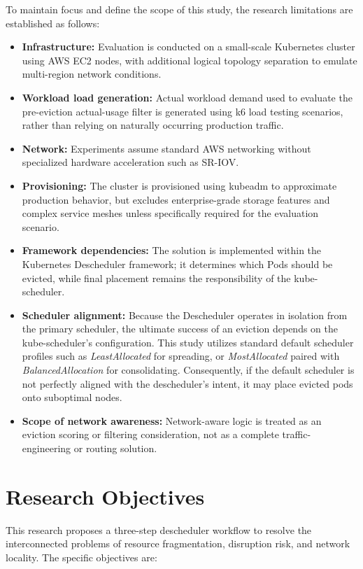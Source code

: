To maintain focus and define the scope of this study, the research limitations are established as follows:

\begin{itemize}
    \item \textbf{Infrastructure:} Evaluation is conducted on a small-scale Kubernetes cluster using AWS EC2 nodes, with additional logical topology separation to emulate multi-region network conditions.
    \item \textbf{Workload load generation:} Actual workload demand used to evaluate the pre-eviction actual-usage filter is generated using k6 load testing scenarios, rather than relying on naturally occurring production traffic.
    \item \textbf{Network:} Experiments assume standard AWS networking without specialized hardware acceleration such as SR-IOV.
    \item \textbf{Provisioning:} The cluster is provisioned using kubeadm to approximate production behavior, but excludes enterprise-grade storage features and complex service meshes unless specifically required for the evaluation scenario.
    \item \textbf{Framework dependencies:} The solution is implemented within the Kubernetes Descheduler framework; it determines which Pods should be evicted, while final placement remains the responsibility of the kube-scheduler.
    \item \textbf{Scheduler alignment:} Because the Descheduler operates in isolation from the primary scheduler, the ultimate success of an eviction depends on the kube-scheduler's configuration. This study utilizes standard default scheduler profiles such as \textit{LeastAllocated} for spreading, or \textit{MostAllocated} paired with \textit{BalancedAllocation} for consolidating. Consequently, if the default scheduler is not perfectly aligned with the descheduler's intent, it may place evicted pods onto suboptimal nodes.
    \item \textbf{Scope of network awareness:} Network-aware logic is treated as an eviction scoring or filtering consideration, not as a complete traffic-engineering or routing solution.
\end{itemize}

\section{Research Objectives}
\label{sec:researchObjectives}

This research proposes a three-step descheduler workflow to resolve the interconnected problems of resource fragmentation, disruption risk, and network locality. The specific objectives are:

